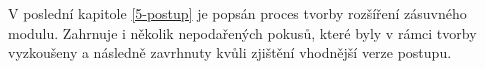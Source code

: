 V poslední kapitole \ref{5-postup} je popsán proces tvorby rozšíření zásuvného modulu.
Zahrnuje i několik nepodařených pokusů, které byly v rámci tvorby vyzkoušeny a následně zavrhnuty 
kvůli zjištění vhodnější verze postupu.
 
% 
% 
% 
% 



                     